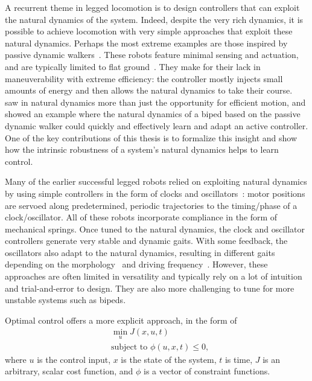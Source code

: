 A recurrent theme in legged locomotion is to design controllers that can exploit the natural dynamics of the system. Indeed, despite the very rich dynamics, it is possible to achieve locomotion with very simple approaches that exploit these natural dynamics.
Perhaps the most extreme examples are those inspired by passive dynamic walkers~\cite{mcgeer1990passive}. These robots feature minimal sensing and actuation, and are typically limited to flat ground~\cite{bhounsule2012design,wisse2006design}. They make for their lack in maneuverability with extreme efficiency: the controller mostly injects small amounts of energy and then allows the natural dynamics to take their course.~\textcite{tedrake2005learning} saw in natural dynamics more than just the opportunity for efficient motion, and showed an example where the natural dynamics of a biped based on the passive dynamic walker could quickly and effectively learn and adapt an active controller. One of the key contributions of this thesis is to formalize this insight and show how the intrinsic robustness of a system's natural dynamics helps to learn control. \par
Many of the earlier successful legged robots relied on exploiting natural dynamics by using simple controllers in the form of clocks and oscillators~\cite{sprowitz2013towards,buchli2006resonance,altendorfer2001rhex,owaki2013simple}: motor positions are servoed along predetermined, periodic trajectories to the timing/phase of a clock/oscillator. All of these robots incorporate compliance in the form of mechanical springs. Once tuned to the natural dynamics, the clock and oscillator controllers generate very stable and dynamic gaits. With some feedback, the oscillators also adapt to the natural dynamics, resulting in different gaits depending on the morphology~\cite{owaki2013simple} and driving frequency~\cite{owaki2017quadruped}. %
However, these approaches are often limited in versatility and typically rely on a lot of intuition and trial-and-error to design. They are also more challenging to tune for more unstable systems such as bipeds. \par
Optimal control offers a more explicit approach, in the form of
\begin{align*}
& \min_{u} J(x, u, t) \\
& \text{subject to } \phi(u, x, t) \leq 0,
\end{align*}
where $u$ is the control input, $x$ is the state of the system, $t$ is time, $J$ is an arbitrary, scalar cost function, and $\phi$ is a vector of constraint functions.
